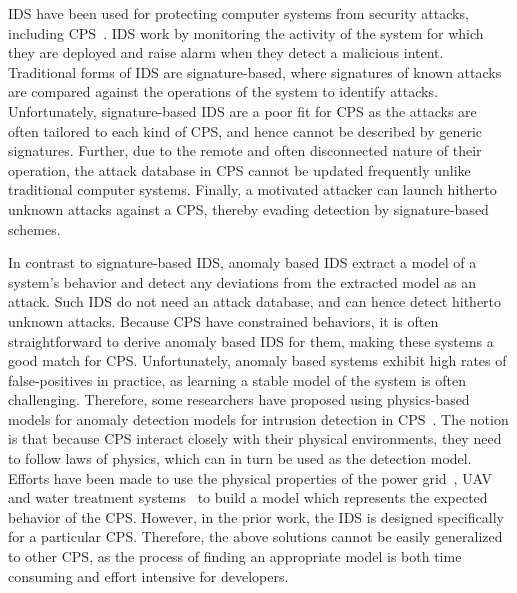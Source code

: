 \ac{IDS} have been used for protecting computer systems from security attacks, including CPS~\cite{lu2015towards, mitchell2015behavior, bernieri2016testbed}. \ac{IDS} work by monitoring the activity of the system for which they are deployed and raise alarm when they detect a malicious intent. Traditional forms of \ac{IDS} are signature-based, where signatures of known attacks are compared against the operations of the system to identify attacks. Unfortunately, signature-based \ac{IDS} are a poor fit for \ac{CPS} as the attacks are often tailored to each kind of \ac{CPS}, and hence cannot be described by generic signatures. Further, due to the remote and often disconnected nature of their operation, the attack database in \ac{CPS} cannot be updated frequently unlike traditional computer systems. Finally, a motivated attacker can launch hitherto unknown attacks against a \ac{CPS}, thereby evading detection by signature-based schemes. 

In contrast to signature-based \ac{IDS}, anomaly based \ac{IDS} extract a model of a system's behavior and detect any deviations from the extracted model as an attack. Such \ac{IDS} do not need an attack database, and can hence detect hitherto unknown attacks. Because \ac{CPS} have constrained behaviors, it is often straightforward to derive anomaly based \ac{IDS} for them, making these systems a good match for \ac{CPS}. Unfortunately, anomaly based systems exhibit high rates of false-positives in practice, as learning a stable model of the system is often challenging. Therefore, some researchers have proposed using physics-based models for anomaly detection models for intrusion detection in \ac{CPS}~\cite{ mitchell2012specification,mitchell2014adaptive,choudhari2013stability,chen2018learning,zohrevand2016hidden}. The notion is that because \ac{CPS} interact closely with their physical environments, they need to follow laws of physics, which can in turn be used as the detection model. 
Efforts have been made to use the physical properties of the power grid~\cite{choudhari2013stability,paul2014unified}, \ac{UAV}~\cite{mitchell2012specification} and water treatment systems~\cite{adepu2016using} to build a model which represents the expected behavior of the \ac{CPS}. However, in the prior work, the \ac{IDS} is designed specifically for a particular \ac{CPS}. Therefore, the above solutions cannot be easily generalized to other \ac{CPS}, as the process of finding an appropriate model is both time consuming and effort intensive for developers. 

